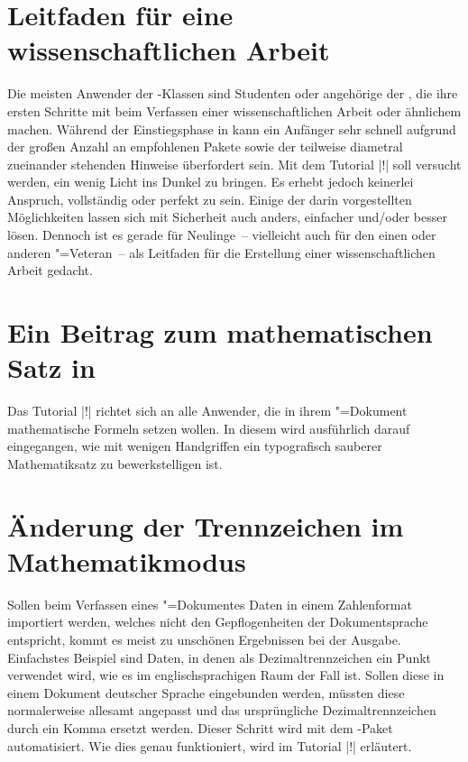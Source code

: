 \section{Leitfaden für eine wissenschaftlichen Arbeit}
%
%
%
Die meisten Anwender der \TUDScript-Klassen sind Studenten oder angehörige der 
\TnUD, die ihre ersten Schritte mit  beim Verfassen einer 
wissenschaftlichen Arbeit oder ähnlichem machen. Während der Einstiegsphase in 
 kann ein Anfänger sehr schnell aufgrund der großen Anzahl an 
empfohlenen Pakete sowie der teilweise diametral zueinander stehenden Hinweise 
überfordert sein. Mit dem Tutorial |!| soll versucht werden, 
ein wenig Licht ins Dunkel zu bringen. Es erhebt jedoch keinerlei Anspruch, 
vollständig oder perfekt zu sein. Einige der darin vorgestellten Möglichkeiten 
lassen sich mit Sicherheit auch anders, einfacher und/oder besser lösen. 
Dennoch ist es gerade für Neulinge~-- vielleicht auch für den einen oder 
anderen "=Veteran~-- als Leitfaden für die Erstellung einer 
wissenschaftlichen Arbeit gedacht.

\section{Ein Beitrag zum mathematischen Satz in }
%
%
%
Das Tutorial |!| richtet sich an alle Anwender, die in ihrem 
"=Dokument mathematische Formeln setzen wollen. In diesem wird 
ausführlich darauf eingegangen, wie mit wenigen Handgriffen ein typografisch 
sauberer Mathematiksatz zu bewerkstelligen ist.

\section{Änderung der Trennzeichen im Mathematikmodus}
%
%
%
%
Sollen beim Verfassen eines "=Dokumentes Daten in einem 
Zahlenformat importiert werden, welches nicht den Gepflogenheiten der 
Dokumentsprache entspricht, kommt es meist zu unschönen Ergebnissen bei der 
Ausgabe. Einfachstes Beispiel sind Daten, in denen als Dezimaltrennzeichen ein 
Punkt verwendet wird, wie es im englischsprachigen Raum der Fall ist. Sollen 
diese in einem Dokument deutscher Sprache eingebunden werden, müssten diese 
normalerweise allesamt angepasst und das ursprüngliche Dezimaltrennzeichen 
durch ein Komma ersetzt werden. Dieser Schritt wird mit dem \TUDScript-Paket 
 automatisiert. Wie dies genau funktioniert, wird im Tutorial 
|!| erläutert.
%

